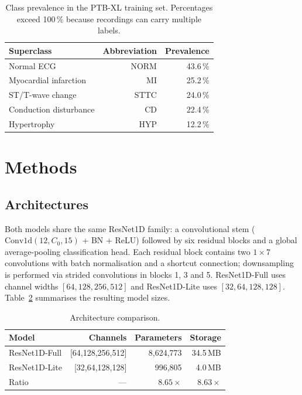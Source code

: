 \documentclass[11pt]{article}
\begin{document}
\begin{table}[h]
\centering
\caption{Class prevalence in the PTB-XL training set. Percentages
exceed 100\,\% because recordings can carry multiple labels.}
\label{tab:data}
\begin{tabular}{lrr}
\toprule
Superclass & Abbreviation & Prevalence \\
\midrule
Normal ECG               & NORM & 43.6\,\% \\
Myocardial infarction    & MI   & 25.2\,\% \\
ST/T-wave change         & STTC & 24.0\,\% \\
Conduction disturbance   & CD   & 22.4\,\% \\
Hypertrophy              & HYP  & 12.2\,\% \\
\bottomrule
\end{tabular}
\end{table}

\section{Methods}
\subsection{Architectures}
Both models share the same ResNet1D family: a convolutional stem
($\text{Conv1d}(12, C_0, 15)$ + BN + ReLU) followed by six residual
blocks and a global average-pooling classification head. Each residual
block contains two $1\times7$ convolutions with batch normalisation
and a shortcut connection; downsampling is performed via strided
convolutions in blocks 1, 3 and 5. ResNet1D-Full uses channel widths
$[64,128,256,512]$ and ResNet1D-Lite uses $[32,64,128,128]$.
Table~\ref{tab:arch} summarises the resulting model sizes.

\begin{table}[h]
\centering
\caption{Architecture comparison.}
\label{tab:arch}
\begin{tabular}{lrrr}
\toprule
Model & Channels & Parameters & Storage \\
\midrule
ResNet1D-Full & [64,128,256,512] & 8{,}624{,}773 & 34.5\,MB \\
ResNet1D-Lite & [32,\phantom{0}64,128,128] &    996{,}805 & \phantom{0}4.0\,MB \\
\midrule
Ratio & --- & $8.65\times$ & $8.63\times$ \\
\bottomrule
\end{tabular}
\end{table}
\end{document}
